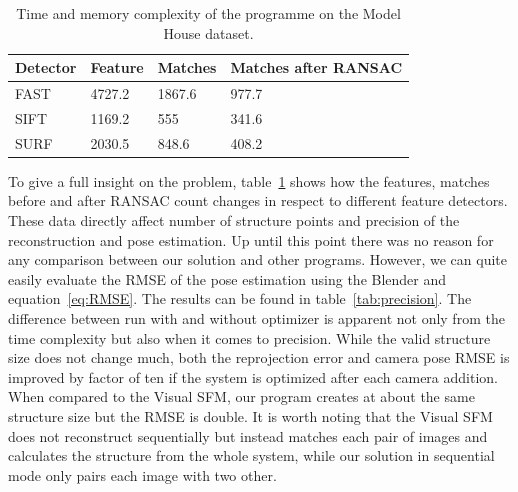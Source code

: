 \begin{table}[!htbp]
	\begin{center}
		\begin{tabular}{| l | l | l | l |}
			\hline
			\textbf{Detector} & \textbf{Feature} &  \textbf{Matches}  & \textbf{Matches after RANSAC}  \\ \hline 
			FAST & 4727.2 & 1867.6 & 977.7 \\ \hline 
			SIFT & 1169.2 & 555 & 341.6 \\ \hline 
			SURF & 2030.5 & 848.6 & 408.2 \\ \hline 
		\end{tabular}
		\caption{Time and memory complexity of the programme on the Model House dataset.}
		\label{tab:keypoints_matches}
	\end{center}
\end{table}

To give a full insight on the problem, table~\ref{tab:keypoints_matches} shows how the features, matches before and after RANSAC count changes in respect to different feature detectors. These data directly affect number of structure points and precision of the reconstruction and pose estimation. Up until this point there was no reason for any comparison between our solution and other programs. However, we can quite easily evaluate the RMSE of the pose estimation using the Blender and equation~\ref{eq:RMSE}.  The results can be found in table~\ref{tab:precision}. The difference between run with and without optimizer is apparent not only from the time complexity but also when it comes to precision. While the valid structure size does not change much, both the reprojection error and camera pose RMSE is improved by factor of ten if the system is optimized after each camera addition. When compared to the Visual SFM, our program creates at about the same structure size but the RMSE is double. It is worth noting that the Visual SFM does not reconstruct sequentially but instead matches each pair of images and calculates the structure from the whole system, while our solution in sequential mode only pairs each image with two other.


